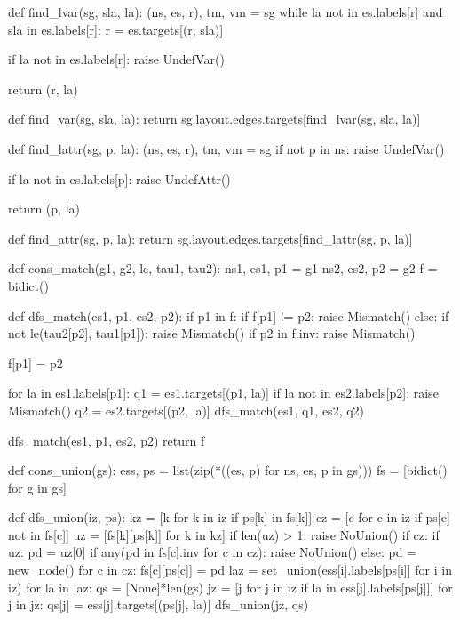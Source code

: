 \begin{dispPy}
def find_lvar(sg, sla, la):
    (ns, es, r), tm, vm = sg
    while la not in es.labels[r] and sla in es.labels[r]:
        r = es.targets[(r, sla)]

    if la not in es.labels[r]:
        raise UndefVar()

    return (r, la)

def find_var(sg, sla, la):
    return sg.layout.edges.targets[find_lvar(sg, sla, la)]

def find_lattr(sg, p, la):
    (ns, es, r), tm, vm = sg
    if not p in ns:
        raise UndefVar()

    if la not in es.labels[p]:
        raise UndefAttr()

    return (p, la)

def find_attr(sg, p, la):
    return sg.layout.edges.targets[find_lattr(sg, p, la)]

def cons_match(g1, g2, le, tau1, tau2):
    ns1, es1, p1 = g1
    ns2, es2, p2 = g2
    f = bidict()

    def dfs_match(es1, p1, es2, p2):
        if p1 in f:
            if f[p1] != p2:
                raise Mismatch()
        else:
            if not le(tau2[p2], tau1[p1]):
                raise Mismatch()
            if p2 in f.inv:
                raise Mismatch()

            f[p1] = p2

            for la in es1.labels[p1]:
                q1 = es1.targets[(p1, la)]
                if la not in es2.labels[p2]:
                    raise Mismatch()
                q2 = es2.targets[(p2, la)]
                dfs_match(es1, q1, es2, q2)

    dfs_match(es1, p1, es2, p2)
    return f

def cons_union(gs):
    ess, ps = list(zip(*((es, p) for ns, es, p in gs)))
    fs = [bidict() for g in gs]

    def dfs_union(iz, ps):
        kz = [k for k in iz if ps[k] in fs[k]]
        cz = [c for c in iz if ps[c] not in fs[c]]
        uz = [fs[k][ps[k]] for k in kz]
        if len(uz) > 1:
            raise NoUnion()
        if cz:
            if uz:
                pd = uz[0]
                if any(pd in fs[c].inv for c in cz):
                    raise NoUnion()
            else:
                pd = new_node()
            for c in cz:
                fs[c][ps[c]] = pd
            laz = set_union(ess[i].labels[ps[i]] for i in iz)
            for la in laz:
                qs = [None]*len(gs)
                jz = [j for j in iz if la in ess[j].labels[ps[j]]]
                for j in jz:
                    qs[j] = ess[j].targets[(ps[j], la)]
                dfs_union(jz, qs)


\end{dispPy}
